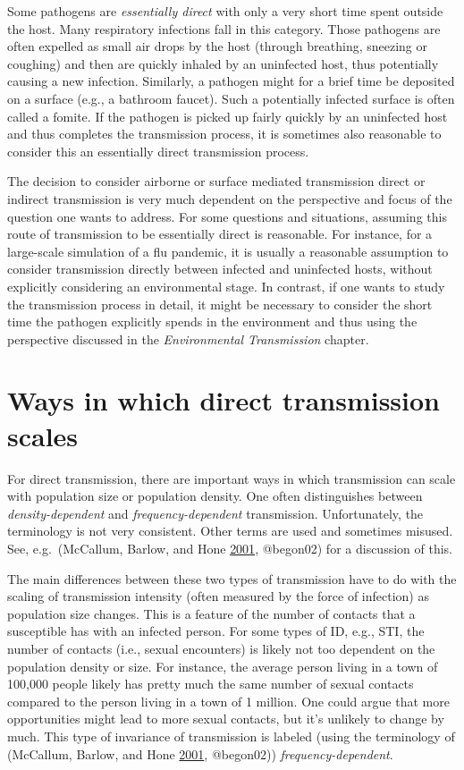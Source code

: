 \documentclass[
]{book}
\begin{document}
Some pathogens are \emph{essentially direct} with only a very short time spent outside the host. Many respiratory infections fall in this category. Those pathogens are often expelled as small air drops by the host (through breathing, sneezing or coughing) and then are quickly inhaled by an uninfected host, thus potentially causing a new infection. Similarly, a pathogen might for a brief time be deposited on a surface (e.g., a bathroom faucet). Such a potentially infected surface is often called a fomite. If the pathogen is picked up fairly quickly by an uninfected host and thus completes the transmission process, it is sometimes also reasonable to consider this an essentially direct transmission process.

The decision to consider airborne or surface mediated transmission direct or indirect transmission is very much dependent on the perspective and focus of the question one wants to address. For some questions and situations, assuming this route of transmission to be essentially direct is reasonable. For instance, for a large-scale simulation of a flu pandemic, it is usually a reasonable assumption to consider transmission directly between infected and uninfected hosts, without explicitly considering an environmental stage. In contrast, if one wants to study the transmission process in detail, it might be necessary to consider the short time the pathogen explicitly spends in the environment and thus using the perspective discussed in the \emph{Environmental Transmission} chapter.

\hypertarget{ways-in-which-direct-transmission-scales}{%
\section{Ways in which direct transmission scales}\label{ways-in-which-direct-transmission-scales}}

For direct transmission, there are important ways in which transmission can scale with population size or population density. One often distinguishes between \emph{density-dependent} and \emph{frequency-dependent} transmission. Unfortunately, the terminology is not very consistent. Other terms are used and sometimes misused. See, e.g.~(McCallum, Barlow, and Hone \protect\hyperlink{ref-mccallum01}{2001}, @begon02) for a discussion of this.

The main differences between these two types of transmission have to do with the scaling of transmission intensity (often measured by the force of infection) as population size changes. This is a feature of the number of contacts that a susceptible has with an infected person. For some types of ID, e.g., STI, the number of contacts (i.e., sexual encounters) is likely not too dependent on the population density or size. For instance, the average person living in a town of 100,000 people likely has pretty much the same number of sexual contacts compared to the person living in a town of 1 million. One could argue that more opportunities might lead to more sexual contacts, but it's unlikely to change by much. This type of invariance of transmission is labeled (using the terminology of (McCallum, Barlow, and Hone \protect\hyperlink{ref-mccallum01}{2001}, @begon02)) \emph{frequency-dependent}.
\end{document}
